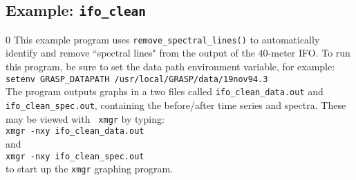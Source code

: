 \clearpage

\subsection{Example: {\tt ifo\_clean} }
\setcounter{equation}0
This example program uses {\tt remove\_spectral\_lines()} to
automatically identify and remove ``spectral lines" from the output
of the 40-meter IFO.  
To run this program, be sure to set the data path environment variable, for
example:\\
{\tt setenv GRASP\_DATAPATH /usr/local/GRASP/data/19nov94.3}\\
The program outputs graphs in a two files called
{\tt ifo\_clean\_data.out} and {\tt ifo\_clean\_spec.out}, containing
the before/after time series and spectra.  These may be viewed with {\tt
xmgr} by typing:\\
{\tt xmgr -nxy ifo\_clean\_data.out}\\
and\\
{\tt xmgr -nxy ifo\_clean\_spec.out}\\
to start up the {\tt xmgr} graphing program.

